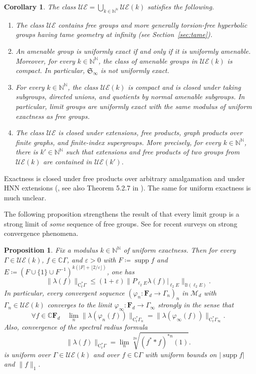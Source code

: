 \documentclass[12pt,nosumlimits,nonamelimits]{amsart}
\newtheorem{corA}[thmA]{Corollary}
\newtheorem{propA}[thmA]{Proposition}
\theoremstyle{remark}
\theoremstyle{definition}
\newcommand{\IB}{\mathbb{B}}
\newcommand{\IC}{\mathbb{C}}
\newcommand{\IN}{\mathbb{N}}
\newcommand{\bF}{\mathbf{F}}
\newcommand{\fS}{\mathfrak{S}}
\newcommand{\rC}{\mathrm{C}}
\newcommand{\rr}{\mathrm{r}}
\newcommand{\cM}{\mathcal{M}}
\newcommand{\ve}{\varepsilon}
\newcommand{\vp}{\varphi}
\newcommand{\Ga}{\Gamma}
\newcommand{\UE}{\mathcal{UE}}
\DeclareMathOperator{\supp}{supp}
\begin{document}
\begin{corA}\label{corA:list}
The class $\UE = \bigcup_{k\in\IN^\IN} \UE(k)$ satisfies the following. 
\begin{enumerate}
\item
The class $\UE$ contains free groups and more generally 
torsion-free hyperbolic groups having tame geometry at infinity 
(see Section~\ref{sec:tame}).
\item 
An amenable group is uniformly exact if and only if 
it is uniformly amenable. 
Moreover, for every $k\in\IN^\IN$, the class of amenable 
groups in $\UE(k)$ is compact. 
In particular, $\fS_\infty$ is not uniformly exact. 
\item
For every $k\in\IN^\IN$, 
the class $\UE(k)$ is compact and is closed under 
taking subgroups, directed unions, 
and quotients by normal amenable subgroups. 
In particular, limit groups are uniformly exact with the same 
modulus of uniform exactness as free groups.
\item\label{cond:extension}
The class $\UE$ is closed under extensions, free products, graph products over finite graphs, and finite-index super\-groups.
More precisely, for every $k\in\IN^\IN$, there is $k'\in\IN^\IN$ 
such that extensions and free products 
of two groups from $\UE(k)$ are contained in $\UE(k')$. 
\end{enumerate}
\end{corA}

Exactness is closed under free products over 
arbitrary amalgamation and under HNN extensions 
(\cite{dykema}, see also Theorem 5.2.7 in \cite{bo}). 
The same for uniform exactness is much unclear. 

The following proposition strengthens the result of \cite{lm} 
that every limit group is a strong limit of \emph{some} 
sequence of free groups. 
See \cite{magee, vanhandel} for recent surveys on 
strong convergence phenomena. 

\begin{propA}\label{propA:norm}
Fix a modulus $k\in\IN^\IN$ of uniform exactness. 
Then for every $\Ga\in\UE(k)$, $f\in\IC\Ga$, and $\ve>0$ 
with $F\coloneq \supp f$ and 
$E \coloneq (F\cup\{1\}\cup F^{-1})^{k(|F|+\lfloor2/\ve\rfloor)}$, 
one has 
\[
\| \lambda(f) \|_{\rC^*_\rr\Ga}
 \le (1+\ve) \| P_{\ell_2E} \lambda(f) |_{\ell_2 E} \|_{\IB(\ell_2E)}. 
\]
In particular, every convergent sequence 
$(\vp_n\colon \bF_d\to\Ga_n)_n$ in $\cM_d$ 
with $\Ga_n\in\UE(k)$ converges to 
the limit $\vp_\infty\colon\bF_d\to\Ga_\infty$ 
strongly in the sense that 
\[
\forall f\in\IC\bF_d\quad
\lim_n \|\lambda(\vp_n(f))\|_{\rC^*_\rr\Ga_n}
 = \|\lambda(\vp_\infty(f))\|_{\rC^*_\rr\Ga_\infty}. 
\]
Also, convergence of the spectral radius formula
\[
\|\lambda(f) \|_{\rC^*_\rr\Ga} = \lim_n \sqrt[2n]{(f^**f)^{*n}(1)}.
\]
is uniform over $\Ga \in \UE(k)$ and over $f \in\IC\Ga$ 
with uniform bounds on $|\supp f|$ and $\|f\|_1$. 
\end{propA}
\end{document}
